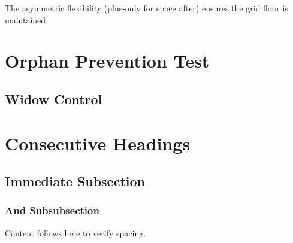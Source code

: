 \documentclass[11pt,a4paper]{article}
\begin{document}
The asymmetric flexibility (plus-only for space after) ensures the grid floor is maintained.

\section{Orphan Prevention Test}
\lipsum[5-6]

\subsection{Widow Control}
\lipsum[7-8]

\section{Consecutive Headings}
\subsection{Immediate Subsection}
\subsubsection{And Subsubsection}
Content follows here to verify spacing.
\end{document}
